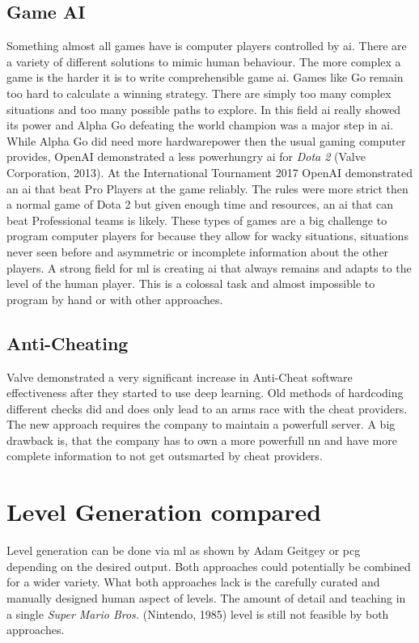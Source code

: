 \documentclass[10pt,a4paper]{article}
\begin{document}
\subsection{Game AI}
Something almost all games have is computer players controlled by \gls{ai}. There are a variety of different solutions to mimic human behaviour. The more complex a game is the harder it is to write comprehensible game \gls{ai}. Games like Go remain too hard to calculate a winning strategy. There are simply too many complex situations and too many possible paths to explore. In this field \gls{ai} really showed its power and Alpha Go defeating the world champion was a major step in \gls{ai}\cite{Silver2016}\cite{Silver2017}. While Alpha Go did need more hardwarepower then the usual gaming computer provides, OpenAI demonstrated a less powerhungry \gls{ai} for \textit{Dota 2} (Valve Corporation, 2013). At the International Tournament 2017 OpenAI demonstrated an \gls{ai} that beat Pro Players at the game reliably.\cite{Openai2017} The rules were more strict then a normal game of Dota 2 but given enough time and resources, an \gls{ai} that can beat Professional teams is likely. These types of games are a big challenge to program computer players for because they allow for wacky situations, situations never seen before and asymmetric or incomplete information about the other players. A strong field for \gls{ml} is creating \gls{ai} that always remains and adapts to the level of the human player. This is a colossal task and almost impossible to program by hand or with other approaches.

\subsection{Anti-Cheating}
Valve demonstrated a very significant increase in Anti-Cheat software effectiveness after they started to use deep learning. Old methods of hardcoding different checks did and does only lead to an arms race with the cheat providers. The new approach requires the company to maintain a powerfull server. A big drawback is, that the company has to own a more powerfull \gls{nn} and have more complete information to not get outsmarted by cheat providers\cite{McDonald2018}.

\section{Level Generation compared}
Level generation can be done via \gls{ml} as shown by Adam Geitgey\citep{AdamGeitgey2016} or \gls{pcg} depending on the desired output. Both approaches could potentially be combined for a wider variety. What both approaches lack is the carefully curated and manually designed human aspect of levels. The amount of detail and teaching in a single \textit{Super Mario Bros.} (Nintendo, 1985) level\cite{EurogamerMiyamotoInterview} is still not feasible by both approaches.
\end{document}
